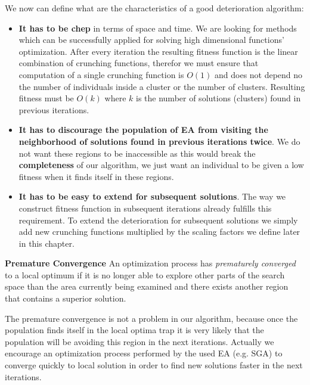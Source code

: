 We now can define what are the characteristics of a good deterioration
algorithm:
\begin{itemize}
  \item \textbf{It has to be chep} in terms of space and time. We are looking
  for methods which can be successfully applied for solving high
  dimensional functions' optimization. After every iteration the resulting
  fitness function is the linear combination of crunching functions, therefor we
  must ensure that computation of a single crunching function is $O(1)$ and does 
  not depend no the number of individuals inside a cluster or the number of
  clusters. Resulting fitness must be $O(k)$ where $k$ is the number of
  solutions (clusters) found in previous iterations.
  
  \item \textbf{It has to discourage the population of EA from visiting the
  neighborhood of solutions found in previous iterations twice}. We do not want
  these regions to be inaccessible as this would break the \textbf{completeness} 
  of our algorithm, we just want an individual to be given a low fitness when it
  finds itself in these regions.
  
  \item \textbf{It has to be easy to extend for subsequent solutions}. The way
  we construct fitness function in subsequent iterations already fulfills
  this requirement. To extend the deterioration for subsequent solutions we
  simply add new crunching functions multiplied by the scaling factors we define
  later in this chapter. 
\end{itemize}


\begin{definition}\label{premature-convergence}
\textbf{Premature Convergence} \cite{globalOpt} An optimization process has
\textit{prematurely converged} to a local optimum if it is no longer able to explore 
other parts of the search space than the area currently being examined and there 
exists another region that contains a superior solution.
\end{definition}

The premature convergence is not a problem in our algorithm, because once the
population finds itself in the local optima trap it is very likely that the
population will be avoiding this region in the next iterations. Actually we
encourage an optimization process performed by the used EA (e.g. SGA) 
to converge quickly to local solution in order to find new solutions 
faster in the next iterations. 

